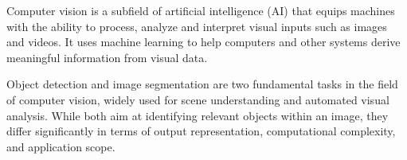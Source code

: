 
Computer vision is a subfield of artificial intelligence (AI) that equips machines with the ability to process, analyze and interpret visual inputs such as images and videos. It uses machine learning to help computers and other systems derive meaningful information from visual data.\cite{ibm_what_nodate}

Object detection and image segmentation are two fundamental tasks in the field of computer vision, widely used for scene understanding and automated visual analysis. While both aim at identifying relevant objects within an image, they differ significantly in terms of output representation, computational complexity, and application scope.
